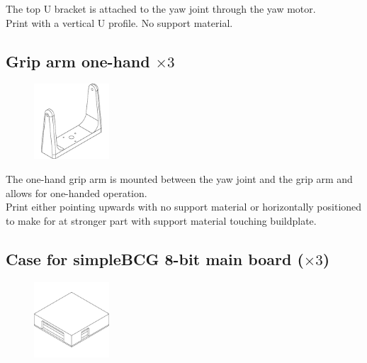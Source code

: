 The top U bracket is attached to the yaw joint through the yaw motor.\\

\raisebox{-0.2cm}{\hspace{-1.5cm}\Huge\Info}\normalsize \quad Print with a vertical U profile. No support material.


\subsection{Grip arm one-hand $\times3$}

\begin{figure}
    \vspace{-3cm}
    \includegraphics[width=0.25\textwidth]{PrintedParts/grip_arm_onehand.PNG}
\end{figure}

The one-hand grip arm is mounted between the yaw joint and the grip arm and allows for one-handed operation.\\

\raisebox{-0.2cm}{\hspace{-1.5cm}\Huge\Info}\normalsize \quad
Print either pointing upwards with no support material or horizontally positioned to make for at stronger part with support material touching buildplate.


\subsection{Case for simpleBCG 8-bit main board ($\times3$)}

\begin{figure}
    \vspace{-1.5cm}
    \includegraphics[width=0.25\textwidth]{PrintedParts/case_main_assembly.PNG}
\end{figure}

